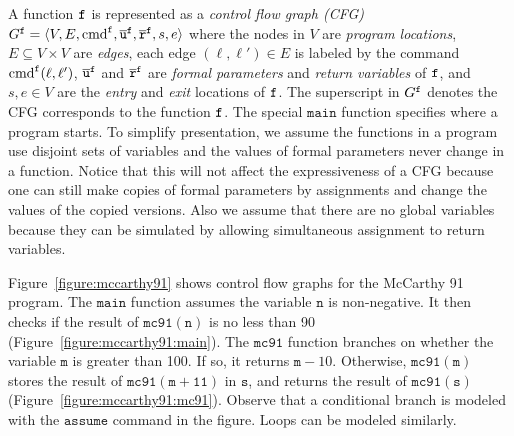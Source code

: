 A function $\mathtt{{f}}$ is represented as a \emph{control flow graph
  (CFG)} $G^{\mathtt{{f}}} = \langle V, E, \textmd{cmd}^{\mathtt{{f}}},
\overline{\mathtt{u}}^{\mathtt{{f}}}, \overline{\mathtt{r}}^{\mathtt{{f}}}, s,
e \rangle$ where the nodes in $V$ are \emph{program locations}, $E
\subseteq V \times V$ are \emph{edges}, each edge $(\ell, \ell') \in
E$ is labeled by the command $\textmd{cmd}^{\mathtt{{f}}} (\ell, \ell')$, $\overline{\mathtt{u}}^{\mathtt{{f}}}$ and $\overline{\mathtt{r}}^{\mathtt{{f}}}$ are \emph{formal parameters} and \emph{return variables} of $\mathtt{{f}}$, and $s,  e \in V$ are the \emph{entry} and \emph{exit} locations of $\mathtt{{f}}$. The superscript in $G^{\mathtt{{f}}}$ denotes the CFG corresponds to the function $\mathtt{{f}}$.
The special $\mathtt{main}$ function specifies where a program starts.
To simplify presentation, we assume the functions in a program use disjoint sets of variables and the values of formal parameters never change in a function. Notice that this will not affect the expressiveness of a CFG because one can still make copies of formal parameters by assignments and change the values of the copied versions. Also we assume that there are no global variables because they can be simulated by allowing simultaneous assignment to return variables. 

Figure~\ref{figure:mccarthy91} shows control flow graphs for the
McCarthy 91 program. The $\mathtt{main}$ function assumes the
variable $\mathtt{n}$ is non-negative. It then checks if the result
of $\mathtt{mc91(n)}$ is no less than 90
(Figure~\ref{figure:mccarthy91:main}). The $\mathtt{mc91}$ function
branches on whether the variable $\mathtt{m}$ is greater than 100. If
so, it returns $\mathtt{m} - 10$. Otherwise, 
$\mathtt{mc91(m)}$ stores the result of $\mathtt{mc91(m + 11)}$
in $\mathtt{s}$, and returns the result of $\mathtt{mc91(s)}$
(Figure~\ref{figure:mccarthy91:mc91}). Observe that a conditional
branch is modeled with the $\mathtt{assume}$ command in the
figure. Loops can be modeled similarly.

